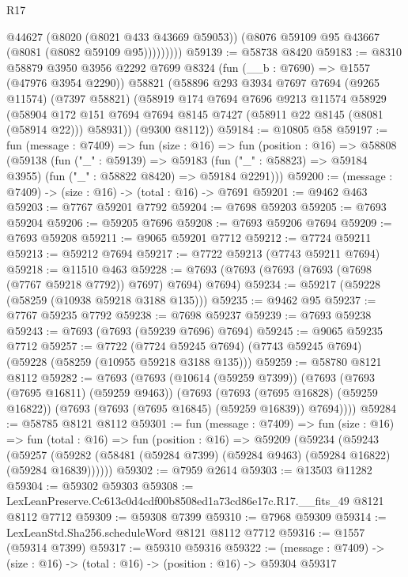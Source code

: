 \begin{lexlean}{R17}
\begin{coremodule}
                @44627
                (@8020 (@8021 @433 @43669 @59053))
                (@8076 @59109 @95 @43667 (@8081 (@8082 @59109 @95)))))))))
@59139 := @58738 @8420
@59183 := @8310
    @58879
    @3950
    @3956
    @2292
    @7699
    @8324
    (fun (__b : @7690) => @1557 (@47976 @3954 @2290))
    @58821
    (@58896
      @293
      @3934
      @7697
      @7694
      (@9265 @11574)
      (@7397 @58821)
      (@58919
        @174
        @7694
        @7696
        @9213
        @11574
        @58929
        (@58904 @172 @151 @7694 @7694 @8145 @7427 (@58911 @22 @8145 (@8081 (@58914 @22))) @58931))
      (@9300 @8112))
@59184 := @10805 @58
@59197 := fun (message : @7409) =>
  fun (size : @16) =>
  fun (position : @16) =>
  @58808
    (@59138
      (fun ("_" : @59139) =>
      @59183 (fun ("_" : @58823) => @59184 @3955) (fun ("_" : @58822 @8420) => @59184 @2291)))
@59200 := (message : @7409) -> (size : @16) -> (total : @16) -> @7691
@59201 := @9462 @463
@59203 := @7767 @59201 @7792
@59204 := @7698 @59203
@59205 := @7693 @59204
@59206 := @59205 @7696
@59208 := @7693 @59206 @7694
@59209 := @7693 @59208
@59211 := @9065 @59201 @7712
@59212 := @7724 @59211
@59213 := @59212 @7694
@59217 := @7722 @59213 (@7743 @59211 @7694)
@59218 := @11510 @463
@59228 := @7693 (@7693 (@7693 (@7693 (@7698 (@7767 @59218 @7792)) @7697) @7694) @7694)
@59234 := @59217 (@59228 (@58259 (@10938 @59218 @3188 @135)))
@59235 := @9462 @95
@59237 := @7767 @59235 @7792
@59238 := @7698 @59237
@59239 := @7693 @59238
@59243 := @7693 (@7693 (@59239 @7696) @7694)
@59245 := @9065 @59235 @7712
@59257 := @7722
    (@7724 @59245 @7694)
    (@7743 @59245 @7694)
    (@59228 (@58259 (@10955 @59218 @3188 @135)))
@59259 := @58780 @8121 @8112
@59282 := @7693
    (@7693
      (@10614 (@59259 @7399))
      (@7693
        (@7693 (@7695 @16811) (@59259 @9463))
        (@7693
          (@7693 (@7695 @16828) (@59259 @16822))
          (@7693 (@7693 (@7695 @16845) (@59259 @16839)) @7694))))
@59284 := @58785 @8121 @8112
@59301 := fun (message : @7409) =>
  fun (size : @16) =>
  fun (total : @16) =>
  fun (position : @16) =>
  @59209
    (@59234
      (@59243
        (@59257 (@59282 (@58481 (@59284 @7399) (@59284 @9463) (@59284 @16822) (@59284 @16839))))))
@59302 := @7959 @2614
@59303 := @13503 @11282
@59304 := @59302 @59303
@59308 := LexLeanPreserve.Cc613c0d4cdf00b8508ed1a73cd86e17c.R17.__fits_49 @8121 @8112 @7712
@59309 := @59308 @7399
@59310 := @7968 @59309
@59314 := LexLeanStd.Sha256.scheduleWord @8121 @8112 @7712
@59316 := @1557 (@59314 @7399)
@59317 := @59310 @59316
@59322 := (message : @7409) -> (size : @16) -> (total : @16) -> (position : @16) -> @59304 @59317

\end{coremodule}
\end{lexlean}
